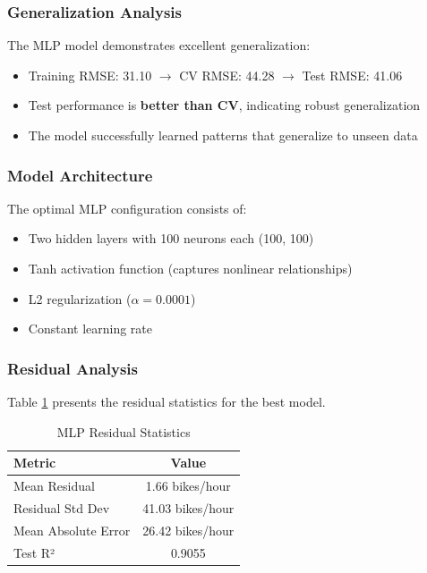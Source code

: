 \documentclass[conference]{IEEEtran}
\begin{document}
\subsubsection{Generalization Analysis}
The MLP model demonstrates excellent generalization:
\begin{itemize}
    \item Training RMSE: 31.10 $\rightarrow$ CV RMSE: 44.28 $\rightarrow$ Test RMSE: 41.06
    \item Test performance is \textbf{better than CV}, indicating robust generalization
    \item The model successfully learned patterns that generalize to unseen data
\end{itemize}

\subsubsection{Model Architecture}
The optimal MLP configuration consists of:
\begin{itemize}
    \item Two hidden layers with 100 neurons each (100, 100)
    \item Tanh activation function (captures nonlinear relationships)
    \item L2 regularization ($\alpha = 0.0001$)
    \item Constant learning rate
\end{itemize}

\subsubsection{Residual Analysis}
Table \ref{tab:residuals} presents the residual statistics for the best model.

\begin{table}[htbp]
  \caption{MLP Residual Statistics}
  \begin{center}
  \begin{tabular}{l c}
    \toprule
    \textbf{Metric} & \textbf{Value} \\
    \midrule
    Mean Residual & 1.66 bikes/hour \\
    Residual Std Dev & 41.03 bikes/hour \\
    Mean Absolute Error & 26.42 bikes/hour \\
    Test R² & 0.9055 \\
    \bottomrule
  \end{tabular}
  \label{tab:residuals}
  \end{center}
\end{table}
\end{document}
